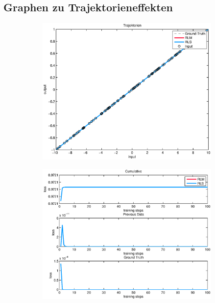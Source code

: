 \documentclass[a4paper, 12pt]{article}
\begin{document}
{\subsection{Graphen zu Trajektorieneffekten}
\label{apx:trajektorien}
\begin{figure}[H]
        \centering
        \begin{subfigure}[b]{0.4\textwidth}
                \centering
                \includegraphics[width=\textwidth]{./images/copyofstats/trajektorien1_approx_100.eps}
                \caption{}
                \label{fig:apx:trajektorien1:approx}
        \end{subfigure}
        \begin{subfigure}[b]{0.4\textwidth}
                \centering
                \includegraphics[width=\textwidth]{./images/copyofstats/trajektorien1_perf_100.eps}

\end{subfigure}
\end{figure}}
\end{document}
